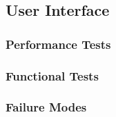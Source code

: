 
\subsection{User Interface}
\label{sec:verification_ui}

\subsubsection{Performance Tests}
\label{sec:ui_pt}

\subsubsection{Functional Tests}
\label{sec:ui_ft}

\subsubsection{Failure Modes}
\label{sec:ui_fm}

